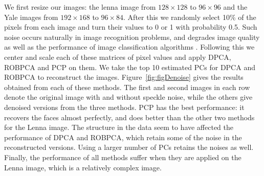 We first resize our images: the lenna image from $128 \times 128$ to $96 \times 96$ and the Yale images from $192 \times 168$ to $96 \times 84$. After this we randomly select 10\% of the pixels from each image and turn their values to 0 or 1 with probability 0.5. Such noise occurs naturally in image recognition problems, and degrades image quality as well as the performance of image classification algorithms \citep{Qiuetal04}. Following this we center and scale each of these matrices of pixel values and apply DPCA, ROBPCA and PCP on them. We take the top 10 estimated PCs for DPCA and ROBPCA to reconstruct the images. Figure~\ref{fig:figDenoise} gives the results obtained from each of these methods. The first and second images in each row denote the original image with and without speckle noise, while the others give denoised versions from the three methods. PCP has the best performance: it recovers the faces almost perfectly, and does better than the other two methods for the Lenna image. The structure in the data seem to have affected the performance of DPCA and ROBPCA, which retain some of the noise in the reconstructed versions. Using a larger number of PCs retains the noises as well. Finally, the performance of all methods suffer when they are applied on the Lenna image, which is a relatively complex image.